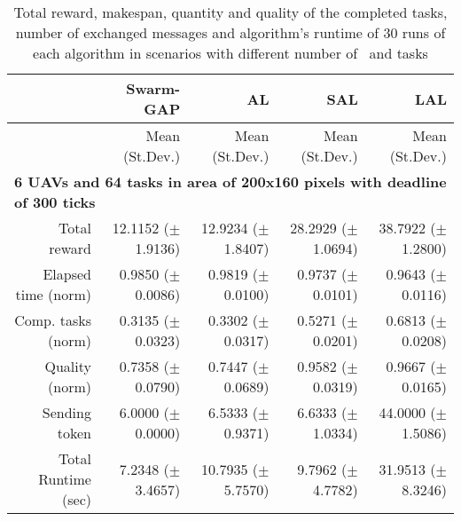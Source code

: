 \begin{table}%
	\small
	\fontsize{6}{6}\selectfont
	\centering
	\caption{Total reward, makespan, quantity and quality of the completed tasks, number of exchanged messages and algorithm's runtime of 30 runs of each algorithm in scenarios with different number of \uavs\ and tasks}
	\label{table:allresults6or9uavs}
	
	\begin{tabular}{rrrrr} \hline
		& Swarm-GAP
		& AL
		& SAL
		& LAL \\ \hline 
		
		& Mean (St.Dev.) & Mean (St.Dev.)  & Mean (St.Dev.)  & Mean (St.Dev.)  \\ [1ex]
		
		\multicolumn{5}{l}{\textbf{6 UAVs and 64 tasks in area of 200x160 pixels with deadline of 300 ticks}} \\
	Total reward           &    12.1152 ($\pm$1.9136)  & 12.9234 ($\pm$1.8407)  & 28.2929 ($\pm$1.0694) & 38.7922  ($\pm$1.2800)  \\
	Elapsed time (norm)    &    0.9850  ($\pm$0.0086)  & 0.9819  ($\pm$0.0100)  & 0.9737  ($\pm$0.0101) &  0.9643  ($\pm$0.0116)  \\ 
	Comp. tasks (norm)     &    0.3135  ($\pm$0.0323)  & 0.3302  ($\pm$0.0317)  & 0.5271  ($\pm$0.0201) &  0.6813  ($\pm$0.0208)  \\ 
	Quality (norm)         &    0.7358  ($\pm$0.0790)  & 0.7447  ($\pm$0.0689)  & 0.9582  ($\pm$0.0319) &  0.9667  ($\pm$0.0165)  \\ 
	Sending token          &    6.0000  ($\pm$0.0000)  & 6.5333  ($\pm$0.9371)  & 6.6333  ($\pm$1.0334) &  44.0000 ($\pm$1.5086)  \\ 
	Total Runtime (sec)    &    7.2348  ($\pm$3.4657)  & 10.7935 ($\pm$5.7570)  &  9.7962 ($\pm$4.7782) &  31.9513 ($\pm$8.3246)  \\ [1ex]


\end{tabular}
\end{table}
